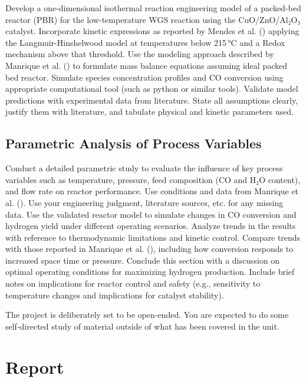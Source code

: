 \documentclass[
  12pt,
  a4paperpaper,
  DIV=11,
  numbers=noendperiod]{scrartcl}
\begin{document}
Develop a one-dimensional isothermal reaction engineering model of a
packed-bed reactor (PBR) for the low-temperature WGS reaction using the
CuO/ZnO/Al₂O₃ catalyst. Incorporate kinetic expressions as reported by
Mendes et al. () applying the
Langmuir-Hinshelwood model at temperatures below 215\,°C and a Redox
mechanism above that threshold. Use the modeling approach described by
Manrique et al. () to formulate
mass balance equations assuming ideal packed bed reactor. Simulate
species concentration profiles and CO conversion using appropriate
computational tool (such as python or similar tools). Validate model
predictions with experimental data from literature. State all
assumptions clearly, justify them with literature, and tabulate physical
and kinetic parameters used.

\subsection{Parametric Analysis of Process
Variables}\label{parametric-analysis-of-process-variables}

Conduct a detailed parametric study to evaluate the influence of key
process variables such as temperature, pressure, feed composition (CO
and H₂O content), and flow rate on reactor performance. Use conditions
and data from Manrique et al. ().
Use your engineering judgment, literature sources, etc. for any missing
data. Use the validated reactor model to simulate changes in CO
conversion and hydrogen yield under different operating scenarios.
Analyze trends in the results with reference to thermodynamic
limitations and kinetic control. Compare trends with those reported in
Manrique et al. (), including how
conversion responds to increased space time or pressure. Conclude this
section with a discussion on optimal operating conditions for maximizing
hydrogen production. Include brief notes on implications for reactor
control and safety (e.g., sensitivity to temperature changes and
implications for catalyst stability).

The project is deliberately set to be open‐ended. You are expected to do
some self‐directed study of material outside of what has been covered in
the unit.

\section{Report}\label{report}
\end{document}
